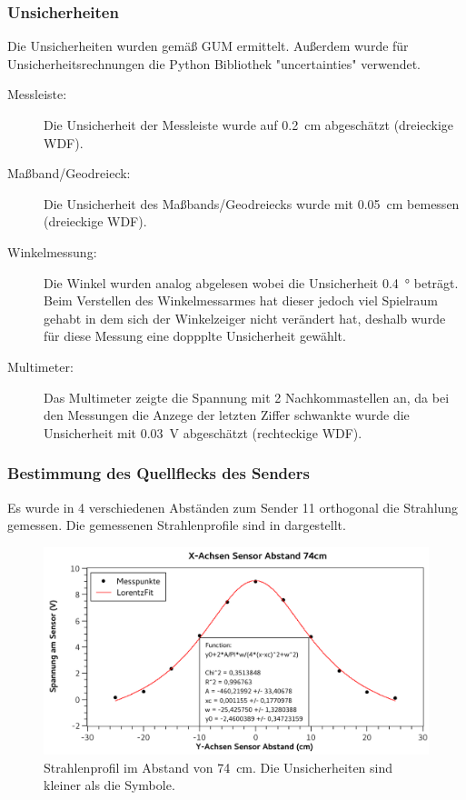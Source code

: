 \documentclass[
	a4paper,
	12pt,
	pagesize,
	ngerman
]{scrartcl}
\begin{document}
	\subsubsection{Unsicherheiten} %
	Die Unsicherheiten wurden gemäß GUM ermittelt. 
	Außerdem wurde für Unsicherheitsrechnungen die Python Bibliothek "uncertainties" verwendet.
	\begin{description}
		\item[Messleiste:] Die Unsicherheit der Messleiste wurde auf \SI{0,2}{cm} abgeschätzt (dreieckige WDF).
		\item[Maßband/Geodreieck:] Die Unsicherheit des Maßbands/Geodreiecks wurde mit \SI{0,05}{cm} bemessen (dreieckige WDF).
		\item[Winkelmessung:]  Die Winkel wurden analog abgelesen wobei die Unsicherheit \SI{0,4}{\degree} beträgt. Beim Verstellen des Winkelmessarmes hat dieser jedoch viel Spielraum gehabt in dem sich der Winkelzeiger nicht verändert hat, deshalb wurde für diese Messung eine doppplte Unsicherheit gewählt.
		\item[Multimeter:] Das Multimeter zeigte die Spannung mit 2 Nachkommastellen an, da bei den Messungen die Anzege der letzten Ziffer schwankte wurde die Unsicherheit mit \SI{0,03}{V} abgeschätzt (rechteckige WDF).
	\end{description}

	\subsubsection{Bestimmung des Quellflecks des Senders}
	Es wurde in 4 verschiedenen Abständen zum Sender 11 orthogonal die Strahlung gemessen. Die gemessenen Strahlenprofile sind in  dargestellt. 
	\begin{figure}[H]
		\includegraphics[width=1\textwidth]{fig_74cm}
		\centering
		\caption{Strahlenprofil im Abstand von \SI{74}{cm}. Die Unsicherheiten sind kleiner als die Symbole.}
		\label{fig_74cm}
		\centering
	\end{figure}
\end{document}
